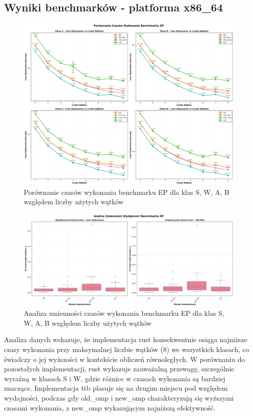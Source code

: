 \subsection{Wyniki benchmarków - platforma x86\_64}
\begin{figure}[H]
    \centering
    \includegraphics[width=\textwidth]{analiza/images/parallel/ep/x86/ep_porownanie_czasow_wykonania.png}
    \caption{Porównanie czasów wykonania benchmarku EP dla klas S, W, A, B względem liczby użytych wątków}
    \label{ep_porownanie_czasow_wykonania_x86_64}
\end{figure}

\begin{figure}[H]
    \centering
    \includegraphics[width=\textwidth]{analiza/images/parallel/ep/x86/ep_analiza_zmiennosci.png}
    \caption{Analiza zmienności czasów wykonania benchmarku EP dla klas S, W, A, B względem liczby użytych wątków}
    \label{ep_analiza_zmiennosci_x86_64}
\end{figure}

Analiza danych wskazuje, że implementacja rust konsekwentnie osiąga najniższe czasy wykonania przy maksymalnej liczbie wątków (8) we wszystkich klasach, co świadczy o jej wyższości w kontekście obliczeń równoległych.
W porównaniu do pozostałych implementacji, rust wykazuje zauważalną przewagę, szczególnie wyraźną w klasach S i W, gdzie różnice w czasach wykonania są bardziej znaczące. Implementacja ttb plasuje się na drugim miejscu pod względem wydajności, podczas gdy old\_omp i new\_omp charakteryzują się wyższymi czasami wykonania, z new\_omp wykazującym najniższą efektywność.

